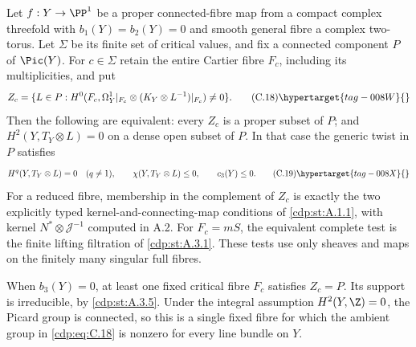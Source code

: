 
\begin{proposition}\hypertarget{tag-01FM}{}\label{cdp:st:C4c}


Let $f:Y\to\PP^1$ be a proper connected-fibre map from a compact complex threefold with $b_1(Y)=b_2(Y)=0$ and smooth general fibre a complex two-torus. Let $\Sigma$ be its finite set of critical values, and fix a connected component $P$ of $\Pic(Y)$. For $c\in\Sigma$ retain the entire Cartier fibre $F_c$, including its multiplicities, and put
\[
 Z_c=\{L\in P:H^0(F_c,\Omega_Y^1|_{F_c}\otimes
                  (K_Y\otimes L^{-1})|_{F_c})\ne0\}.
                                                               \tag{C.18}\hypertarget{tag-008W}{}\label{cdp:eq:C.18}
\]
Then the following are equivalent: every $Z_c$ is a proper subset of $P$; and $H^2(Y,T_Y\otimes L)=0$ on a dense open subset of $P$. In that case the generic twist in $P$ satisfies
\[
 H^q(Y,T_Y\otimes L)=0\quad(q\ne1),\qquad
 \chi(Y,T_Y\otimes L)\le0,\qquad c_3(Y)\le0.          \tag{C.19}\hypertarget{tag-008X}{}\label{cdp:eq:C.19}
\]
For a reduced fibre, membership in the complement of $Z_c$ is exactly the two explicitly typed kernel-and-connecting-map conditions of \ref{cdp:st:A.1.1}, with kernel $N^*\otimes\mathcal J^{-1}$ computed in A.2. For $F_c=mS$, the equivalent complete test is the finite lifting filtration of \ref{cdp:st:A.3.1}. These tests use only sheaves and maps on the finitely many singular full fibres.

When $b_3(Y)=0$, at least one fixed critical fibre $F_c$ satisfies $Z_c=P$. Its support is irreducible, by \ref{cdp:st:A.3.5}. Under the integral assumption $H^2(Y,\Z)=0$, the Picard group is connected, so this is a single fixed fibre for which the ambient group in \eqref{cdp:eq:C.18} is nonzero for every line bundle on $Y$.
\end{proposition}

